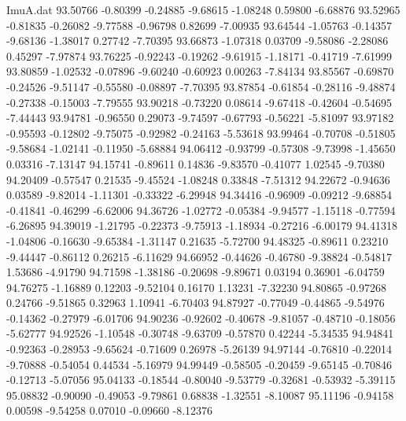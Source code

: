 \begin{filecontents}{ImuA.dat}
  93.50766   -0.80399   -0.24885   -9.68615   -1.08248    0.59800   -6.68876
  93.52965   -0.81835   -0.26082   -9.77588   -0.96798    0.82699   -7.00935
  93.64544   -1.05763   -0.14357   -9.68136   -1.38017    0.27742   -7.70395
  93.66873   -1.07318    0.03709   -9.58086   -2.28086    0.45297   -7.97874
  93.76225   -0.92243   -0.19262   -9.61915   -1.18171   -0.41719   -7.61999
  93.80859   -1.02532   -0.07896   -9.60240   -0.60923    0.00263   -7.84134
  93.85567   -0.69870   -0.24526   -9.51147   -0.55580   -0.08897   -7.70395
  93.87854   -0.61854   -0.28116   -9.48874   -0.27338   -0.15003   -7.79555
  93.90218   -0.73220    0.08614   -9.67418   -0.42604   -0.54695   -7.44443
  93.94781   -0.96550    0.29073   -9.74597   -0.67793   -0.56221   -5.81097
  93.97182   -0.95593   -0.12802   -9.75075   -0.92982   -0.24163   -5.53618
  93.99464   -0.70708   -0.51805   -9.58684   -1.02141   -0.11950   -5.68884
  94.06412   -0.93799   -0.57308   -9.73998   -1.45650    0.03316   -7.13147
  94.15741   -0.89611    0.14836   -9.83570   -0.41077    1.02545   -9.70380
  94.20409   -0.57547    0.21535   -9.45524   -1.08248    0.33848   -7.51312
  94.22672   -0.94636    0.03589   -9.82014   -1.11301   -0.33322   -6.29948
  94.34416   -0.96909   -0.09212   -9.68854   -0.41841   -0.46299   -6.62006
  94.36726   -1.02772   -0.05384   -9.94577   -1.15118   -0.77594   -6.26895
  94.39019   -1.21795   -0.22373   -9.75913   -1.18934   -0.27216   -6.00179
  94.41318   -1.04806   -0.16630   -9.65384   -1.31147    0.21635   -5.72700
  94.48325   -0.89611    0.23210   -9.44447   -0.86112    0.26215   -6.11629
  94.66952   -0.44626   -0.46780   -9.38824   -0.54817    1.53686   -4.91790
  94.71598   -1.38186   -0.20698   -9.89671    0.03194    0.36901   -6.04759
  94.76275   -1.16889    0.12203   -9.52104    0.16170    1.13231   -7.32230
  94.80865   -0.97268    0.24766   -9.51865    0.32963    1.10941   -6.70403
  94.87927   -0.77049   -0.44865   -9.54976   -0.14362   -0.27979   -6.01706
  94.90236   -0.92602   -0.40678   -9.81057   -0.48710   -0.18056   -5.62777
  94.92526   -1.10548   -0.30748   -9.63709   -0.57870    0.42244   -5.34535
  94.94841   -0.92363   -0.28953   -9.65624   -0.71609    0.26978   -5.26139
  94.97144   -0.76810   -0.22014   -9.70888   -0.54054    0.44534   -5.16979
  94.99449   -0.58505   -0.20459   -9.65145   -0.70846   -0.12713   -5.07056
  95.04133   -0.18544   -0.80040   -9.53779   -0.32681   -0.53932   -5.39115
  95.08832   -0.90090   -0.49053   -9.79861    0.68838   -1.32551   -8.10087
  95.11196   -0.94158    0.00598   -9.54258    0.07010   -0.09660   -8.12376

\end{filecontents}
